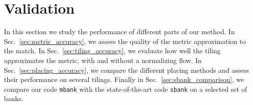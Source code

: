 \documentclass[twocolumn,showpacs,preprintnumbers,nofootinbib,prd,
superscriptaddress,10pt]{revtex4-2}
\begin{document}

\section{Validation} \label{sec:validation}

In this section we study the performance of different parts of our method. In Sec.~\ref{sec:metric_accuracy}, we assess the quality of the metric approximation to the match. In Sec.~\ref{sec:tiling_accuracy}, we evaluate how well the tiling approximates the metric, with and without a normalizing flow.
In Sec.~\ref{sec:placing_accuracy}, we compare the different placing methods and assess their performance on several tilings.
Finally in Sec.~\ref{sec:sbank_comparison}, we compare our code \texttt{mbank} with the state-of-the-art code \texttt{sbank} \cite{Ajith:2012mn} on a selected set of banks.
\end{document}
